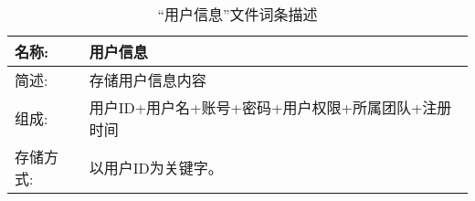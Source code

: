 \begin{table}[H]  
\caption{“用户信息”文件词条描述}  
\begin{center}  
    \begin{tabular}{l p{10cm}} 
        \hline
        \quad 名称:  &  用户信息 \\
        \hline
        \quad 简述:  & 存储用户信息内容\\
        \hline
        \quad 组成:  & 用户ID+用户名+账号+密码+用户权限+所属团队+注册时间 \\
        \hline
        \quad 存储方式:  & 以用户ID为关键字。 \\
        \hline
    \end{tabular}
    \label{tab1}
\end{center}
\end{table}
